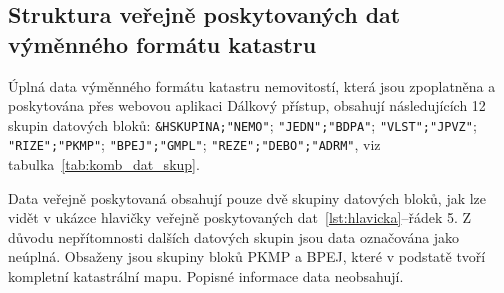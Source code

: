 \subsection{Struktura veřejně poskytovaných dat výměnného formátu katastru}
\label{subsec:neuplna_data}
Úplná data výměnného formátu katastru nemovitostí, která jsou
zpoplatněna a poskytována přes webovou aplikaci Dálkový přístup,
obsahují následujících 12 skupin datových bloků:
\verb|&HSKUPINA;"NEMO"|; \verb|"JEDN";"BDPA"|; \verb|"VLST";"JPVZ"|;
\verb|"RIZE";"PKMP"|; \verb|"BPEJ";"GMPL"|;
\verb|"REZE";"DEBO";"ADRM"|, viz tabulka~\ref{tab:komb_dat_skup}.

Data veřejně poskytovaná obsahují pouze dvě skupiny datových bloků, jak lze vidět v
ukázce hlavičky veřejně poskytovaných dat~\ref{lst:hlavicka}--řádek 5. Z důvodu
nepřítomnosti dalších datových skupin jsou data označována jako
neúplná. Obsaženy jsou skupiny bloků PKMP a BPEJ, které v podstatě tvoří
kompletní katastrální mapu. Popisné informace data neobsahují.

